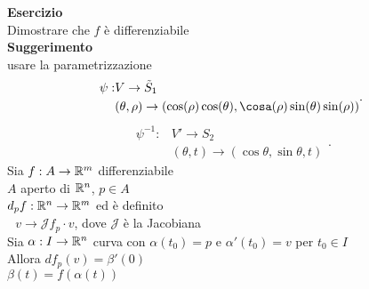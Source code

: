 \documentclass[12px]{article}
\begin{document}
	\textbf{Esercizio}\\
	Dimostrare che $f$ è differenziabile\\
	\textbf{Suggerimento}\\
	usare la parametrizzazione
	\[
		\begin{aligned}
			\psi: &V \rightarrow \tilde S_1\\
			      & (\theta,\rho) \rightarrow (\cos(\rho)\cos(\theta),\cosa(\rho)\sin(\theta)\sin(\rho))

		\end{aligned}
	.\] 
		\[
		\begin{aligned}
			\psi^{-1} : &V' \rightarrow S_{2}\\
				    &(\theta, t) \rightarrow (\cos\theta, \sin\theta, t)
		\end{aligned}
		.\] 
		Sia $f : A \rightarrow \mathbb{R}^m$ differenziabile \\ 
		$A$ aperto di $\mathbb{R}^n$, $p\in A$\\
		 $d_p f : \mathbb{R}^n \rightarrow \mathbb{R}^m$ ed è definito\\
		 $\ \ \ v \rightarrow \mathcal J f_p\cdot v$, dove $\mathcal J$ è la Jacobiana\\
		 Sia  $\alpha : I \rightarrow \mathbb{R}^n$ curva con $\alpha(t_0) = p$ e $\alpha'(t_0) = v$ per $t_0\in I$\\
		 Allora $df_p(v) = \beta'(0)$\\
		  $\beta(t) = f(\alpha(t))$
\end{document}
